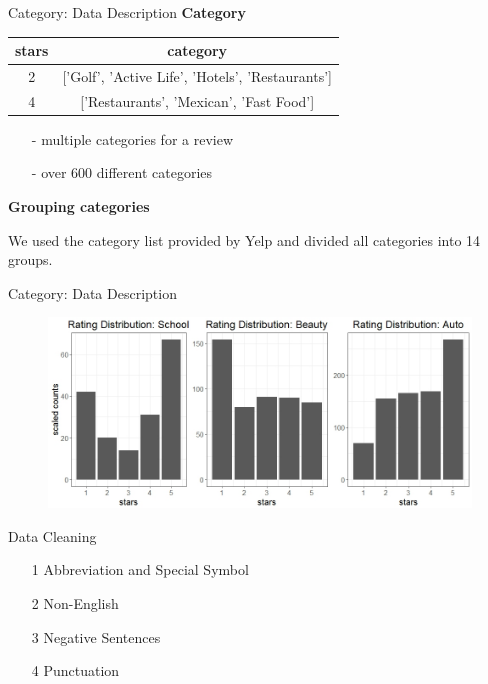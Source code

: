 \documentclass[10pt]{beamer}
\begin{document}
\begin{frame}{Category: Data Description}
\textbf{Category}

\begin{table}[]
\centering
\label{my-label}
\begin{tabular}{c|c}
\hline
stars & category          \\
\hline
2     & {[}'Golf', 'Active Life', 'Hotels', 'Restaurants'{]}    \\
\hline
4     & {[}'Restaurants', 'Mexican', 'Fast Food'{]} \\
\hline
\end{tabular}
\end{table}
\begin{itemize}
    \item[-] multiple categories for a review
    \item[-] over 600 different categories
\end{itemize}

\textbf{Grouping categories}

We used the category list provided by Yelp and divided all categories into 14 groups. 
\end{frame}

\begin{frame}{Category: Data Description}
\begin{figure}
    \centering
    \includegraphics[scale=0.42]{cate.jpeg}
    
\end{figure}    
\end{frame}


\begin{frame}{Data Cleaning}


\begin{itemize}

	\item[1] Abbreviation and Special Symbol

	\item[2] Non-English

	\item[3] Negative Sentences
	
	\item[4] Punctuation

\end{itemize}

\end{frame}
\end{document}
